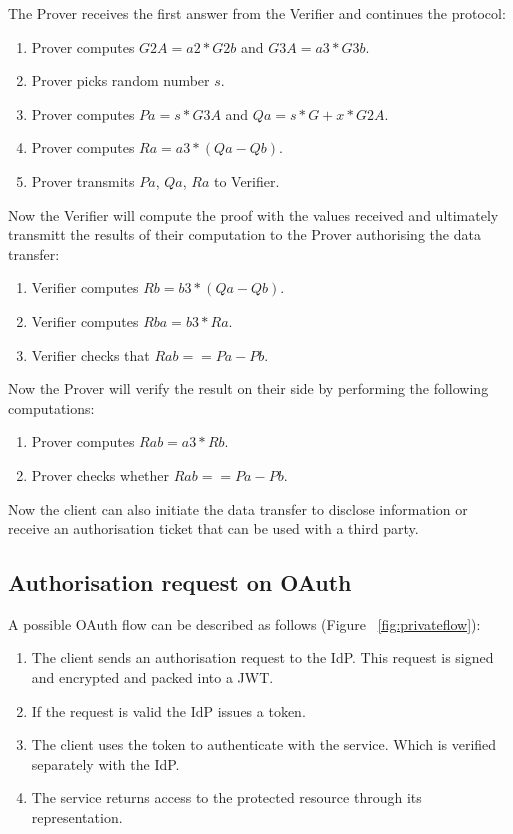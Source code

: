 The Prover receives the first answer from the Verifier and continues the protocol:
\begin{enumerate}
    \item Prover computes $G2A = a2 * G2b$ and $G3A = a3 * G3b$.
    \item Prover picks random number $s$.
    \item Prover computes $Pa = s * G3A$ and $Qa = s * G + x * G2A$.
    \item Prover computes $Ra = a3 * (Qa - Qb)$.
    \item Prover transmits $Pa$, $Qa$, $Ra$ to Verifier.
\end{enumerate}

Now the Verifier will compute the proof with the values received and ultimately transmitt the results of their computation to the Prover authorising the data transfer:
\begin{enumerate}
    \item Verifier computes $Rb = b3 * (Qa - Qb)$.
    \item Verifier computes $Rba = b3 * Ra$.
    \item Verifier checks that $Rab == Pa - Pb$.
\end{enumerate}

Now the Prover will verify the result on their side by performing the following computations:

\begin{enumerate}
    \item Prover computes $Rab = a3 * Rb$.
    \item Prover checks whether $Rab == Pa - Pb$.
\end{enumerate}

Now the client can also initiate the data transfer to disclose information or receive an authorisation ticket that can be used with a third party.

\subsection{Authorisation request on OAuth}

A possible OAuth flow can be described as follows (Figure ~\ref{fig:privateflow}):
\begin{enumerate}
    \item The client sends an authorisation request to the IdP. This request is signed and encrypted and packed into a JWT.
    \item If the request is valid the IdP issues a token.
    \item The client uses the token to authenticate with the service. Which is verified separately with the IdP.
    \item The service returns access to the protected resource through its representation.
\end{enumerate}


